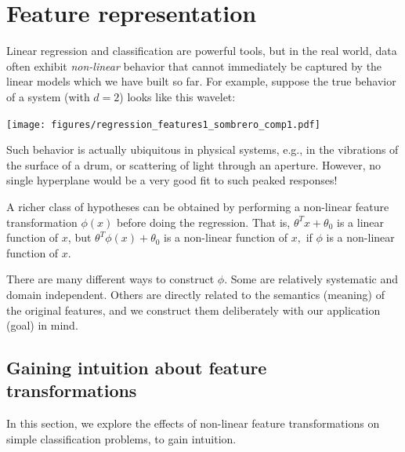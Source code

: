 \chapter{Feature representation}
\label{chap-features}

Linear regression and classification are powerful tools, but in the real world, data often
exhibit {\em non-linear} behavior that cannot immediately be
captured by the linear models which we have built so far.  For example,
suppose the true behavior of a system (with $d=2$) looks like this
wavelet:
%

\centerline{\texttt{[image: figures/regression\_features1\_sombrero\_comp1.pdf]}}

\noindent
Such behavior is actually ubiquitous in physical systems, e.g., in the
vibrations of the surface of a drum, or scattering of light through an
aperture.  However, no single hyperplane would be a very good fit to
such peaked responses!

A richer class of hypotheses can be obtained by performing a
non-linear feature transformation $\phi(x)$ before doing the
regression. That is, $\theta^Tx + \theta_0$ is a linear function of
$x$, but $\theta^T\phi(x) + \theta_0$ is a non-linear function of $x,$
if $\phi$ is a non-linear function of $x$.

There are many different ways to construct $\phi$.  Some are
relatively systematic and domain independent.
Others are directly related to the semantics (meaning) of the original
features, and we construct them deliberately with our application (goal) in mind.

\section{Gaining intuition about feature transformations}

\label{sec-features_classifiers}

In this section, we explore the effects of non-linear feature
transformations on simple classification problems, to gain intuition.




